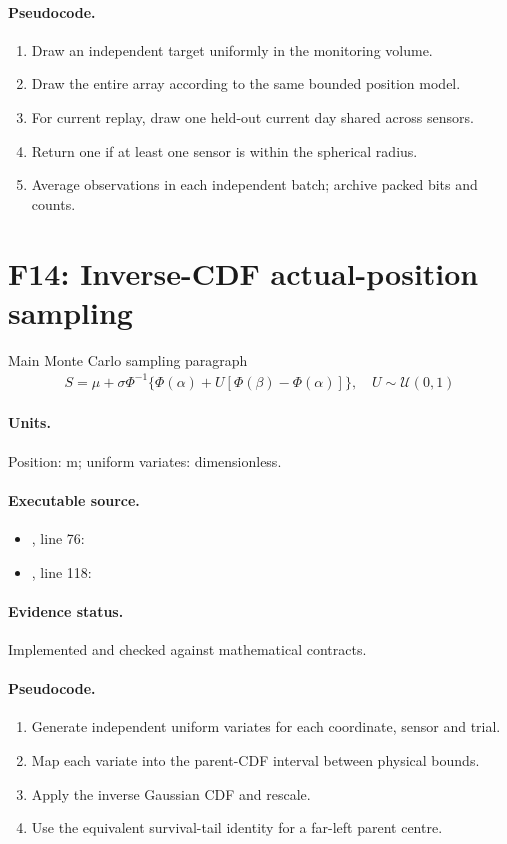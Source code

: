 \documentclass[10pt]{article}
\begin{document}
\paragraph{Pseudocode.}
\begin{enumerate}[leftmargin=*]
\item Draw an independent target uniformly in the monitoring volume.
\item Draw the entire array according to the same bounded position model.
\item For current replay, draw one held-out current day shared across sensors.
\item Return one if at least one sensor is within the spherical radius.
\item Average observations in each independent batch; archive packed bits and counts.
\end{enumerate}
\newpage
\section*{F14: Inverse-CDF actual-position sampling}
Main Monte Carlo sampling paragraph
\begin{gather*}S=\mu+\sigma\Phi^{-1}\{\Phi(\alpha)+U[\Phi(\beta)-\Phi(\alpha)]\},\quad U\sim\mathcal U(0,1)\end{gather*}
\paragraph{Units.} Position: m; uniform variates: dimensionless.
\paragraph{Executable source.}
\begin{itemize}[leftmargin=*]
\item {}, line 76: 
\item {}, line 118: 
\end{itemize}
\paragraph{Evidence status.} Implemented and checked against mathematical contracts.
\paragraph{Pseudocode.}
\begin{enumerate}[leftmargin=*]
\item Generate independent uniform variates for each coordinate, sensor and trial.
\item Map each variate into the parent-CDF interval between physical bounds.
\item Apply the inverse Gaussian CDF and rescale.
\item Use the equivalent survival-tail identity for a far-left parent centre.
\end{enumerate}
\newpage
\end{document}
